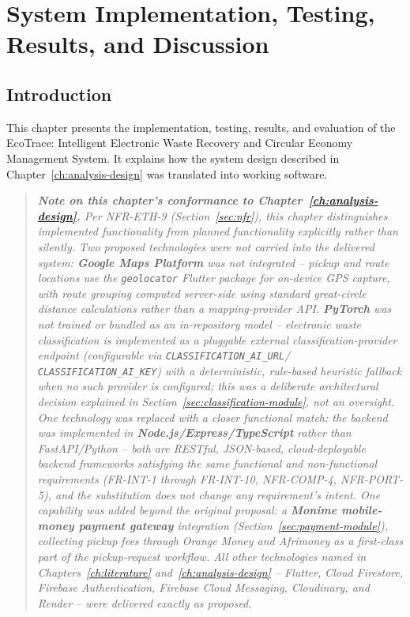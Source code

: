 \chapter{System Implementation, Testing, Results, and Discussion}
\label{ch:implementation}

\section{Introduction}

This chapter presents the implementation, testing, results, and evaluation of
the EcoTrace: Intelligent Electronic Waste Recovery and Circular Economy
Management System. It explains how the system design described in
Chapter~\ref{ch:analysis-design} was translated into working software.

\begin{quote}
\small\itshape
\textbf{Note on this chapter's conformance to Chapter~\ref{ch:analysis-design}.}
Per NFR-ETH-9 (Section~\ref{sec:nfr}), this chapter distinguishes implemented
functionality from planned functionality explicitly rather than silently. Two
proposed technologies were not carried into the delivered system: \textbf{Google
Maps Platform} was not integrated -- pickup and route locations use the
\texttt{geolocator} Flutter package for on-device GPS capture, with route
grouping computed server-side using standard great-circle distance
calculations rather than a mapping-provider API. \textbf{PyTorch} was not
trained or bundled as an in-repository model -- electronic waste
classification is implemented as a pluggable external classification-provider
endpoint (configurable via \texttt{CLASSIFICATION\_AI\_URL}/
\texttt{CLASSIFICATION\_AI\_KEY}) with a deterministic, rule-based heuristic
fallback when no such provider is configured; this was a deliberate
architectural decision explained in Section~\ref{sec:classification-module}, not an
oversight. One technology was replaced with a closer functional match:
the backend was implemented in \textbf{Node.js/Express/TypeScript} rather
than FastAPI/Python -- both are RESTful, JSON-based, cloud-deployable
backend frameworks satisfying the same functional and non-functional
requirements (FR-INT-1 through FR-INT-10, NFR-COMP-4, NFR-PORT-5), and
the substitution does not change any requirement's intent. One capability was
added beyond the original proposal: a \textbf{Monime mobile-money payment
gateway} integration (Section~\ref{sec:payment-module}), collecting pickup fees
through Orange Money and Afrimoney as a first-class part of the pickup-request
workflow. All other technologies named in Chapters~\ref{ch:literature}
and~\ref{ch:analysis-design} -- Flutter, Cloud Firestore, Firebase Authentication,
Firebase Cloud Messaging, Cloudinary, and Render -- were delivered exactly as
proposed.
\end{quote}

